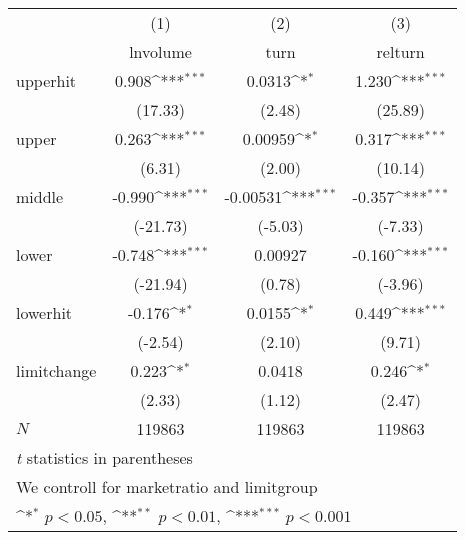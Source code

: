 {
\def\sym#1{\ifmmode^{#1}\else\(^{#1}\)\fi}
\begin{tabular}{l*{3}{c}}
\hline\hline
            &\multicolumn{1}{c}{(1)}&\multicolumn{1}{c}{(2)}&\multicolumn{1}{c}{(3)}\\
            &\multicolumn{1}{c}{lnvolume}&\multicolumn{1}{c}{turn}&\multicolumn{1}{c}{relturn}\\
\hline
upperhit    &       0.908\sym{***}&      0.0313\sym{*}  &       1.230\sym{***}\\
            &     (17.33)         &      (2.48)         &     (25.89)         \\
[1em]
upper       &       0.263\sym{***}&     0.00959\sym{*}  &       0.317\sym{***}\\
            &      (6.31)         &      (2.00)         &     (10.14)         \\
[1em]
middle      &      -0.990\sym{***}&    -0.00531\sym{***}&      -0.357\sym{***}\\
            &    (-21.73)         &     (-5.03)         &     (-7.33)         \\
[1em]
lower       &      -0.748\sym{***}&     0.00927         &      -0.160\sym{***}\\
            &    (-21.94)         &      (0.78)         &     (-3.96)         \\
[1em]
lowerhit    &      -0.176\sym{*}  &      0.0155\sym{*}  &       0.449\sym{***}\\
            &     (-2.54)         &      (2.10)         &      (9.71)         \\
[1em]
limitchange &       0.223\sym{*}  &      0.0418         &       0.246\sym{*}  \\
            &      (2.33)         &      (1.12)         &      (2.47)         \\
\hline
\(N\)       &      119863         &      119863         &      119863         \\
\hline\hline
\multicolumn{4}{l}{\footnotesize \textit{t} statistics in parentheses}\\
\multicolumn{4}{l}{\footnotesize We controll for marketratio and limitgroup}\\
\multicolumn{4}{l}{\footnotesize \sym{*} \(p<0.05\), \sym{**} \(p<0.01\), \sym{***} \(p<0.001\)}\\
\end{tabular}
}
